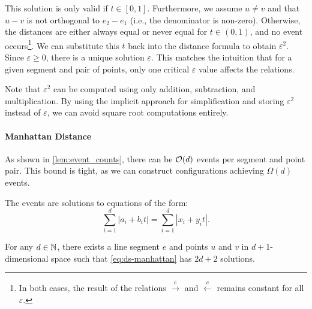This solution is only valid if \(t \in [0, 1]\). Furthermore, we assume \(u \neq v\) and that \(u-v\) is not orthogonal to \(e_2 - e_1\) (i.e., the denominator is non-zero). Otherwise, the distances are either always equal or never equal for \(t \in (0,1)\), and no event occurs\footnote{In both cases, the result of the relations \(\overset e\rightarrow\) and \(\overset e\leftarrow\) remains constant for all \(\varepsilon\).}. We can substitute this \(t\) back into the distance formula to obtain \(\varepsilon^2\). Since \(\varepsilon \geq 0\), there is a unique solution \(\varepsilon\). This matches the intuition that for a given segment and pair of points, only one critical \(\varepsilon\) value affects the relations.

Note that \(\varepsilon^2\) can be computed using only addition, subtraction, and multiplication. By using the implicit approach for simplification and storing \(\varepsilon^2\) instead of \(\varepsilon\), we can avoid square root computations entirely.

\paragraph{Manhattan Distance}
As shown in \cref{lem:event_counts}, there can be \(\mathcal{O}(d)\) events per segment and point pair. This bound is tight, as we can construct configurations achieving \(\Omega(d)\) events.

The events are solutions to equations of the form:
\begin{equation}\label{eq:ds-manhattan}
	\sum_{i=1}^d |a_i + b_i t| = \sum_{i=1}^d |x_i + y_i t|.
\end{equation}

\begin{lemma}\label{lem:ds-manhattan}
	For any \(d \in \mathbb{N}\), there exists a line segment \(e\) and points \(u\) and \(v\) in \(d+1\)-dimensional space such that \cref{eq:ds-manhattan} has \(2d + 2\) solutions. 
\end{lemma}

